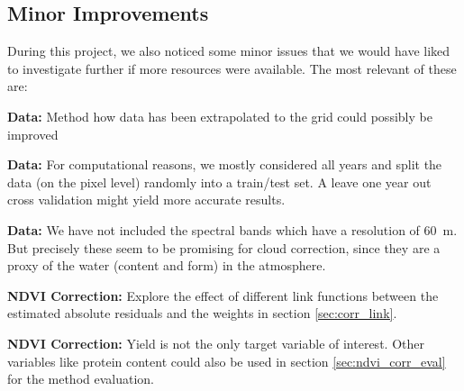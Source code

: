 {    \subsection{Minor Improvements}
        During this project, we also noticed some minor issues that we would have liked to investigate further if more resources were available. The most relevant of these are:
        \begin{Nitemize}
            \item \textbf{Data:}
            Method how data has been extrapolated to the grid could possibly be improved
            \item \textbf{Data:}
            For computational reasons, we mostly considered all years and split the data (on the pixel level) randomly into a train/test set. A leave one year out cross validation might yield more accurate results.
            \item \textbf{Data:}
            We have not included the spectral bands which have a resolution of 60 m. But precisely these seem to be promising for cloud correction, since they are a proxy of the water (content and form) in the atmosphere.
            \item \textbf{NDVI Correction:}
            Explore the effect of different link functions between the estimated absolute residuals and the weights in section \ref{sec:corr_link}.
            \item \textbf{NDVI Correction:}
            Yield is not the only target variable of interest. Other variables like protein content could also be used in section \ref{sec:ndvi_corr_eval} for the method evaluation. 
        \end{Nitemize}
}


